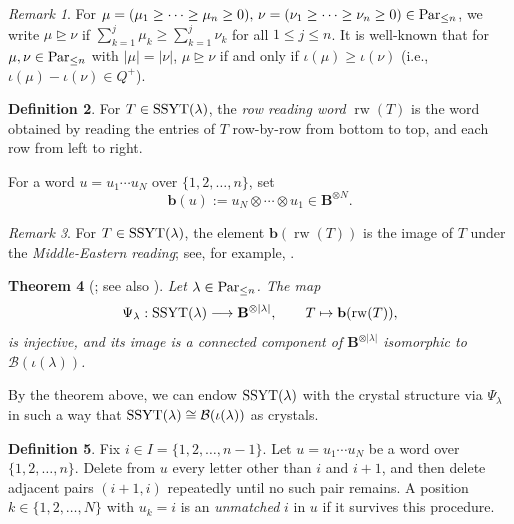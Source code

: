 \documentclass[reqno]{amsart}
\newtheorem{theorem}{Theorem}[section]
\theoremstyle{definition}
\newtheorem{definition}[theorem]{Definition}
\theoremstyle{remark}
\newtheorem{remark}[theorem]{Remark}
\numberwithin{equation}{section}
\newcommand{\B}{\mathcal{B}}
\newcommand{\dom}{\trianglerighteq}
\newcommand{\rw}{\operatorname{rw}}
\begin{document}
	\begin{remark}\label{rem:dominance-partition}
		For $\mu=(\mu_1\ge\cdots\ge\mu_n\ge0),\,\nu=(\nu_1\ge\cdots\ge\nu_n\ge0)\in\mathrm{Par}_{\le n}$,
		we write $\mu\dom\nu$ if $\sum_{k=1}^{j}\mu_k\ge\sum_{k=1}^{j}\nu_k$
		for all $1\le j\le n$.
		It is well-known that for $\mu,\nu\in\mathrm{Par}_{\le n}$ with $|\mu|=|\nu|$,
		$\mu\dom\nu$ if and only if $\iota(\mu)\ge\iota(\nu)$ (i.e., $\iota(\mu)-\iota(\nu)\in Q^+$).
	\end{remark}
	
	\begin{definition}\label{def:rw}
		For $T\in\operatorname{SSYT}(\lambda)$, the \emph{row reading word} $\rw(T)$ is the word
		obtained by reading the entries of $T$ row-by-row from bottom to top, and each
		row from left to right.
	\end{definition}
	
	For a word $u=u_1\cdots u_N$ over
	$\{1,2,\dots,n\}$, set
	\[
	\mathbf{b}(u):=\boxed{u_N}\otimes\cdots\otimes\boxed{u_1}\in\mathbf{B}^{\otimes N}.
	\]
	\begin{remark}
		For $T\in\operatorname{SSYT}(\lambda)$, 
		the element $\mathbf{b}(\rw(T))$ is the image of $T$ under the \emph{Middle-Eastern reading};
		see, for example, \cite[Definition 7.3.4(2)]{hongkong}.
	\end{remark}
	
	\begin{theorem}[{\cite[\S 3.1]{bumpschilling}}; see also {\cite[Chapter 7]{hongkong}}]\label{thm:rw-iso}
		Let $\lambda\in\mathrm{Par}_{\le n}$.
		The map
		\[ \Psi_\lambda:\SSYT(\lambda)\longrightarrow\mathbf B^{\otimes|\lambda|},\qquad
		T\mapsto\mathbf{b}(\rw(T)),
		\]
		is injective, and its image is a connected component of $\mathbf B^{\otimes|\lambda|}$
		isomorphic to $\B(\iota(\lambda))$.
	\end{theorem}
	
	By the theorem above,
	we can endow $\operatorname{SSYT}(\lambda)$ with the crystal structure via $\Psi_\lambda$ in such a way that
	$\SSYT(\lambda)\cong\B(\iota(\lambda))$ as crystals.
	
	\begin{definition}\label{def:unmatched}
		Fix $i\in I=\{1,2,\dots,n-1\}$.
		Let $u=u_1\cdots u_N$ be a word over $\{1,2,\dots,n\}$.
		Delete from $u$ every letter other than $i$ and $i+1$, and then delete
		adjacent pairs $(i+1,i)$ repeatedly until no such pair remains.
		A position
		$k\in\{1,2,\dots,N\}$ with $u_k=i$ is an \emph{unmatched} $i$ in $u$ if it survives this
		procedure.
	\end{definition}
	
\end{document}
